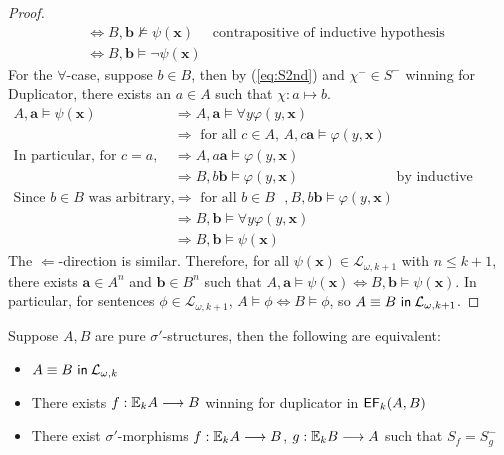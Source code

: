 \begin{prop}
\begin{proof}
\begin{align*}
&\Leftrightarrow B,\mathbf{b} \not\vDash \psi(\mathbf{x})  & \text{contrapositive of inductive hypothesis}\\
&\Leftrightarrow B,\mathbf{b} \vDash \neg\psi(\mathbf{x}) 
\end{align*}
For the $\forall$-case, suppose $b \in B$, then by (\ref{eq:S2nd}) and $\chi^{-} \in S^{-}$ winning for Duplicator, there exists an $a \in A$ such that $\chi:a \mapsto b$. 
\begin{align*}
A,\mathbf{a} \vDash \psi(\mathbf{x})  &\Rightarrow A,\mathbf{a} \vDash \forall y \varphi(y,\mathbf{x}) \\
&\Rightarrow \text{ for all $c \in A$, } A,c\mathbf{a} \vDash \varphi(y,\mathbf{x}) \\
\text{In particular, for $c = a$,} &\Rightarrow A,a\mathbf{a} \vDash \varphi(y,\mathbf{x})\\
&\Rightarrow B,b\mathbf{b} \vDash \varphi(y,\mathbf{x}) & \text{by inductive hypothesis}\\
\text{Since $b \in B$ was arbitrary,} &\Rightarrow \text{ for all $b \in B$ }, B,b\mathbf{b} \vDash \varphi(y,\mathbf{x}) \\
&\Rightarrow B,\mathbf{b} \vDash \forall y \varphi(y,\mathbf{x}) \\ 
&\Rightarrow B,\mathbf{b} \vDash \psi(\mathbf{x}) 
\end{align*}
The $\Leftarrow$-direction is similar. Therefore, for all $\psi(\mathbf{x}) \in \mathcal{L}_{\omega,k+1}$ with $n \leq k+1$, there exists $\mathbf{a} \in A^{n}$ and $\mathbf{b} \in B^{n}$ such that $A,\mathbf{a} \vDash \psi(\mathbf{x}) \Leftrightarrow B,\mathbf{b} \vDash \psi(\mathbf{x})$. In particular, for sentences $\phi \in \mathcal{L}_{\omega,k+1}$, $A \vDash \phi \Leftrightarrow B \vDash \phi$, so ${A \equiv B \ \mathsf{in}\: \mathcal{L}_{\omega,k+1}}$. 
\end{proof}
\begin{cor}
Suppose $A,B$ are pure $\sigma'$-structures, then the following are equivalent:
\begin{itemize}
\item ${A \equiv B \ \mathsf{in}\: \mathcal{L}_{\omega,k}}$ 
\item There exists $f:{\mathbb{E}_{k}A} \longrightarrow B$ winning for duplicator in ${\mathsf{EF}_{k}(A,B)}$ 
\item There exist $\sigma'$-morphisms $f:{\mathbb{E}_{k}A} \longrightarrow B$, $g:{\mathbb{E}_{k}B} \longrightarrow A$ such that $S_{f} = S_{g}^{-}$ 
\end{itemize}
\label{cor:backForthEF}
\end{cor}
\end{prop}
